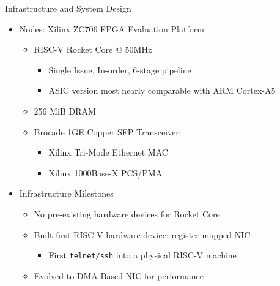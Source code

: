 \begin{block}{Infrastructure and System Design}
    \begin{itemize}
        \item Nodes: Xilinx ZC706 FPGA Evaluation Platform
            \begin{itemize}
                \item RISC-V Rocket Core @ 50MHz
                    \begin{itemize}
                        \item Single Issue, In-order, 6-stage pipeline
                        \item ASIC version most nearly comparable with ARM Cortex-A5
                    \end{itemize}
                \item 256 MiB DRAM
                \item Brocade 1GE Copper SFP Transceiver
                    \begin{itemize}
                        \item Xilinx Tri-Mode Ethernet MAC
                        \item Xilinx 1000Base-X PCS/PMA
                    \end{itemize}

            \end{itemize} 
        \item Infrastructure Milestones
            \begin{itemize}
                \item No pre-existing hardware devices for Rocket Core
                \item Built first RISC-V hardware device: register-mapped NIC
                    \begin{itemize}
                        \item First \texttt{telnet/ssh} into a physical RISC-V machine
                    \end{itemize}
                \item Evolved to DMA-Based NIC for performance
            \end{itemize}
    \end{itemize}


\end{block}
